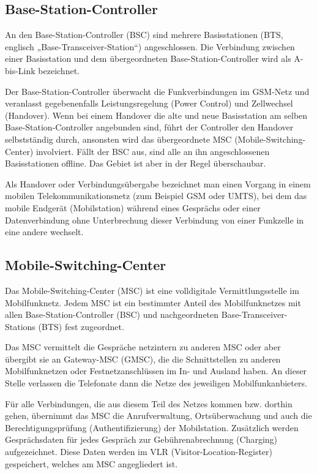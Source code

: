 \documentclass[loesung]{schulein}
\begin{document}
\subsection*{Base-Station-Controller}
An den Base-Station-Controller (BSC) sind mehrere Basisstationen (BTS, englisch „Base-Transceiver-Station“) angeschlossen. Die Verbindung zwischen einer Basisstation und dem übergeordneten Base-Station-Controller wird als A-bis-Link bezeichnet. %

Der Base-Station-Controller überwacht die Funkverbindungen im GSM-Netz und veranlasst gegebenenfalls Leistungsregelung (Power Control) und Zellwechsel (Handover). Wenn bei einem Handover die alte und neue Basisstation am selben Base-Station-Controller angebunden sind, führt der Controller den Handover selbstständig durch, ansonsten wird das übergeordnete MSC (Mobile-Switching-Center) involviert. Fällt der BSC aus, sind alle an ihn angeschlossenen Basisstationen offline. Das Gebiet ist aber in der Regel überschaubar.

Als Handover oder Verbindungsübergabe bezeichnet man einen Vorgang in einem mobilen Telekommunikationsnetz (zum Beispiel GSM oder UMTS), bei dem das mobile Endgerät (Mobilstation) während eines Gesprächs oder einer Datenverbindung ohne Unterbrechung dieser Verbindung von einer Funkzelle in eine andere wechselt.

\subsection*{Mobile-Switching-Center}
Das Mobile-Switching-Center (MSC) ist eine volldigitale Vermittlungsstelle im Mobilfunknetz. 
Jedem MSC ist ein bestimmter Anteil des Mobilfunknetzes mit allen Base-Station-Controller (BSC) und nachgeordneten Base-Transceiver-Stations (BTS) fest zugeordnet.

Das MSC vermittelt die Gespräche netzintern zu anderen MSC oder aber übergibt sie an Gateway-MSC (GMSC), die die Schnittstellen zu anderen Mobilfunknetzen oder Festnetzanschlüssen im In- und Ausland haben. An dieser Stelle verlassen die Telefonate dann die Netze des jeweiligen Mobilfunkanbieters.

Für alle Verbindungen, die aus diesem Teil des Netzes kommen bzw. dorthin gehen, übernimmt das MSC die Anrufverwaltung, Ortsüberwachung und auch die Berechtigungsprüfung (Authentifizierung) der Mobilstation. Zusätzlich werden Gesprächsdaten für jedes Gespräch zur Gebührenabrechnung (Charging) aufgezeichnet. Diese Daten werden im VLR (Visitor-Location-Register) gespeichert, welches am MSC angegliedert ist.
\end{document}
